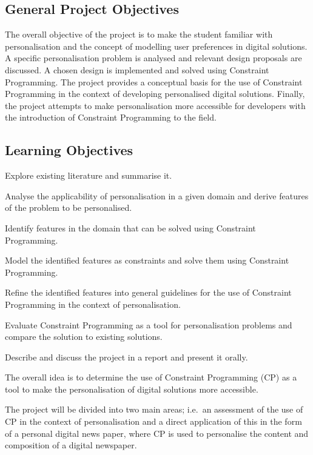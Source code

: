 \subsection{General Project Objectives}
The overall objective of the project is to make the student familiar with personalisation and the concept of modelling user preferences in digital solutions. A specific personalisation problem is analysed and relevant design proposals are discussed. A chosen design is implemented and solved using Constraint Programming. The project provides a conceptual basis for the use of Constraint Programming in the context of developing personalised digital solutions. Finally, the project attempts to make personalisation more accessible for developers with the introduction of Constraint Programming to the field.

\subsection{Learning Objectives}
Explore existing literature and summarise it.

Analyse the applicability of personalisation in a given domain and derive features of the problem to be personalised.

Identify features in the domain that can be solved using Constraint Programming.

Model the identified features as constraints and solve them using Constraint Programming.

Refine the identified features into general guidelines for the use of Constraint Programming in the context of personalisation.

Evaluate Constraint Programming as a tool for personalisation problems and compare the solution to existing solutions.

Describe and discuss the project in a report and present it orally.

The overall idea is to determine the use of Constraint Programming (CP) as a tool to make the personalisation of digital solutions more accessible.

The project will be divided into two main areas; i.e.~an assessment of the use of CP in the context of personalisation and a direct application of this in the form of a personal digital news paper, where CP is used to personalise the content and composition of a digital newspaper.

